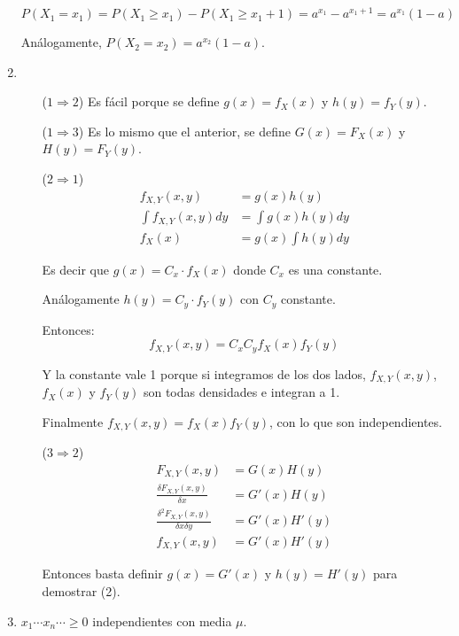 \begin{enumerate}
		$$P(X_1 = x_1) = P(X_1 \geq x_1) - P(X_1\geq x_1+1) = a^{x_1} - a^{x_1+1} = a^{x_1}(1-a)$$
		
		Análogamente, $P(X_2 = x_2) = a^{x_2}(1-a)$.
		
	\item \hfill 
		\begin{itemize}				
			\item[($1\Rightarrow 2$)]
				Es fácil porque se define $g(x) = f_X(x)$ y $h(y) = f_Y(y)$.
			
			\item[($1\Rightarrow 3$)]
				Es lo mismo que el anterior, se define $G(x) = F_X(x)$ y $H(y) = F_Y(y)$.
				
			\item[($2\Rightarrow 1$)]
				\begin{align*}				
					f_{X,Y}(x,y)		& = g(x)h(y)			\\
					\int f_{X,Y}(x,y)dy	& = \int g(x)h(y) dy	\\
					f_X(x)				& = g(x) \int h(y) dy
				\end{align*}
				
				Es decir que $g(x) = C_x\cdot f_X(x)$ donde $C_x$ es una constante.
				
				Análogamente $h(y) = C_y\cdot f_Y(y)$ con $C_y$ constante.
				
				Entonces:
				$$f_{X,Y}(x,y) = C_xC_yf_X(x)f_Y(y)$$
				
				Y la constante vale 1 porque si integramos de los dos lados, $f_{X,Y}(x,y)$, $f_X(x)$ y $f_Y(y)$ son todas densidades e integran a 1.
				
				Finalmente $f_{X,Y}(x,y) = f_X(x)f_Y(y)$, con lo que son independientes.
				
			\item[($3\Rightarrow 2$)]
				\begin{align*}
					F_{X,Y}(x,y)									& = G(x)H(y)	\\
					\frac{\delta F_{X,Y}(x,y)}{\delta x}			& = G'(x)H(y)	\\
					\frac{\delta^2 F_{X,Y}(x,y)}{\delta x \delta y}	& = G'(x)H'(y)	\\
					f_{X,Y}(x,y)									& = G'(x)H'(y)
				\end{align*}
				
				Entonces basta definir $g(x) = G'(x)$ y $h(y) = H'(y)$ para demostrar (2).
		\end{itemize}
		
	\item
		$x_1 \cdots x_n \cdots \geq 0$ independientes con media $\mu$.
		

\end{enumerate}
